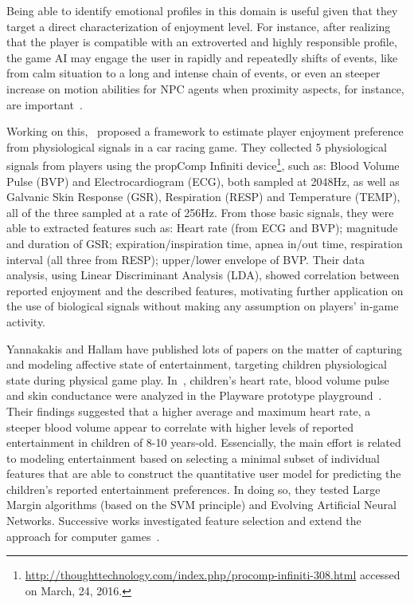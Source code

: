 Being able to identify emotional profiles in this domain is useful given that they target a direct characterization of enjoyment level. For instance, after realizing that the player is compatible with an extroverted and highly responsible profile, the game AI may engage the user in rapidly and repeatedly shifts of events, like from calm situation to a long and intense chain of events, or even an steeper increase on motion abilities for NPC agents when proximity aspects, for instance, are important~\cite{bakkes2012player}.

Working on this,~\cite{tognetti2010modeling} proposed a framework to estimate player enjoyment preference from physiological signals in a car racing game. They collected 5 physiological signals from players using the propComp Infiniti device\footnote{\url{http://thoughttechnology.com/index.php/procomp-infiniti-308.html} accessed on March, 24, 2016.}, such as: Blood Volume Pulse (BVP) and Electrocardiogram (ECG), both sampled at 2048Hz, as well as Galvanic Skin Response (GSR), Respiration (RESP) and Temperature (TEMP), all of the three sampled at a rate of 256Hz. From those basic signals, they were able to extracted features such as: Heart rate (from ECG and BVP); magnitude and duration of GSR; expiration/inspiration time, apnea in/out time, respiration interval (all three from RESP); upper/lower envelope of BVP. Their data analysis, using Linear Discriminant Analysis (LDA), showed correlation between reported enjoyment and the described features, motivating further application on the use of biological signals without making any assumption on players' in-game activity.

Yannakakis and Hallam have published lots of papers on the matter of capturing and modeling affective state of entertainment, targeting children physiological state during physical game play. In~\cite{yannakakis2006modeling,yannakakis2008entertainment}, children's heart rate, blood volume pulse and skin conductance were analyzed in the Playware prototype playground~\cite{lund2005playware}. Their findings suggested that a higher average and maximum heart rate, a steeper blood volume appear to correlate with higher levels of reported entertainment in children of 8-10 years-old. Essencially, the main effort is related to modeling entertainment based on selecting a minimal subset of individual features that are able to construct the quantitative user model for predicting the children's reported entertainment preferences. In doing so, they tested Large Margin algorithms (based on the SVM principle) and Evolving Artificial Neural Networks. Successive works investigated feature selection and extend the approach for computer games~\cite{yanakakis2006,yannakakis2007entertainment,yannakakis2007feature,yannakakis2008entertainmentB}. 

